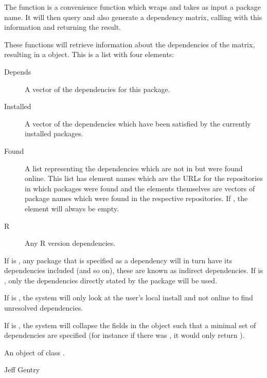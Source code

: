 %
\begin{Details}\relax
The function  is a convenience function which wraps
 and takes as input a package name.  It will then
query 
and also generate a dependency
matrix, calling  with this information and returning
the result.

These functions will retrieve information about the dependencies of
the matrix, resulting in a  object.  This is a
list with four elements:
\begin{description}

\item[Depends] A vector of the dependencies for this package.
\item[Installed] A vector of the dependencies which have been
satisfied by the currently installed packages.
\item[Found] A list representing the dependencies which are not in
 but were found online.  This list has element
names which are the URLs for the repositories in which packages
were found and the elements themselves are vectors of package
names which were found in the respective repositories.  If
, the  element will always be empty.
\item[R] Any R version dependencies.

\end{description}


If  is , any package that is specified as a
dependency will in turn have its dependencies included (and so on),
these are known as indirect dependencies.  If  is 
, only the dependencies directly stated by the package will 
be used.

If  is , the system will only look at the user's local
install and not online to find unresolved dependencies.

If  is , the system will collapse the fields in the
 object such that a minimal set of dependencies
are specified (for instance if there was
, it would only return
).
\end{Details}
%
\begin{Value}
An object of class .
\end{Value}
%
\begin{Author}\relax
 Jeff Gentry 
\end{Author}
